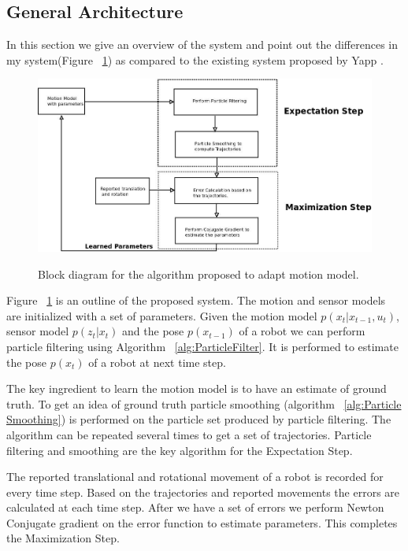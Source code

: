 \documentclass[12pt]{dalcsthesis}
\begin{document}
\subsection{General Architecture}
In this section we give an overview of the system and point out the differences in my system(Figure ~\ref{fig-General Architecture}) as compared to the existing system proposed by Yapp \cite{Yap2008}. 
\begin{figure}
  \centering
     {\includegraphics[height = 3.0 in]{Diagram1.jpeg}}
  \caption{\label{fig-General Architecture} Block diagram for the algorithm proposed to adapt motion model.}
\end{figure}
Figure ~\ref{fig-General Architecture} is an outline of the proposed system. The motion and sensor models are initialized with a set of parameters. Given the motion model $p(x_{t}|x_{t-1},u_{t})$, sensor model $p(z_{t}|x_{t})$ and the pose $p(x_{t-1})$ of a robot we can perform particle filtering using Algorithm ~\ref{alg:ParticleFilter}. It is performed to estimate the pose $p(x_{t})$ of a robot at next time step. 

The key ingredient to learn the motion model is to have an estimate of ground truth. To get an idea of ground truth particle smoothing (algorithm ~\ref{alg:Particle Smoothing}) is performed on the particle set produced by particle filtering. The algorithm can be repeated several times to get a set of trajectories. Particle filtering and smoothing are the key algorithm for the Expectation Step. 

The reported translational and rotational movement of a robot is recorded for every time step. Based on the trajectories and reported movements the errors are calculated at each time step. After we have a set of errors we perform Newton Conjugate gradient on the error function to estimate parameters. This completes the Maximization Step.
\end{document}
